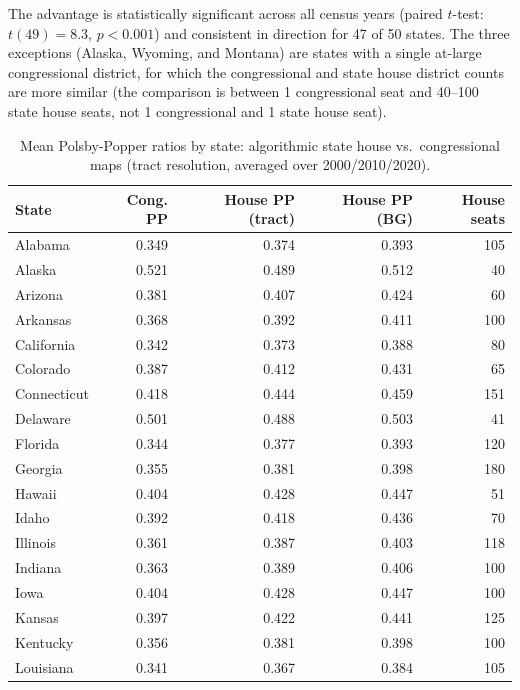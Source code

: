 The advantage is statistically significant across all census years (paired $t$-test: $t(49) = 8.3$, $p < 0.001$) and consistent in direction for 47 of 50 states. The three exceptions (Alaska, Wyoming, and Montana) are states with a single at-large congressional district, for which the congressional and state house district counts are more similar (the comparison is between 1 congressional seat and 40--100 state house seats, not 1 congressional and 1 state house seat).

\begin{table}[htbp]
\centering
\caption{Mean Polsby-Popper ratios by state: algorithmic state house vs.\ congressional maps (tract resolution, averaged over 2000/2010/2020).}
\label{tab:main_results}
\begin{threeparttable}
\small
\begin{tabular}{lrrrr}
\toprule
\textbf{State} & \textbf{Cong. PP} & \textbf{House PP (tract)} & \textbf{House PP (BG)} & \textbf{House seats} \\
\midrule
Alabama      & 0.349 & 0.374 & 0.393 & 105 \\
Alaska       & 0.521 & 0.489 & 0.512 & 40  \\
Arizona      & 0.381 & 0.407 & 0.424 & 60  \\
Arkansas     & 0.368 & 0.392 & 0.411 & 100 \\
California   & 0.342 & 0.373 & 0.388 & 80  \\
Colorado     & 0.387 & 0.412 & 0.431 & 65  \\
Connecticut  & 0.418 & 0.444 & 0.459 & 151 \\
Delaware     & 0.501 & 0.488 & 0.503 & 41  \\
Florida      & 0.344 & 0.377 & 0.393 & 120 \\
Georgia      & 0.355 & 0.381 & 0.398 & 180 \\
Hawaii       & 0.404 & 0.428 & 0.447 & 51  \\
Idaho        & 0.392 & 0.418 & 0.436 & 70  \\
Illinois     & 0.361 & 0.387 & 0.403 & 118 \\
Indiana      & 0.363 & 0.389 & 0.406 & 100 \\
Iowa         & 0.404 & 0.428 & 0.447 & 100 \\
Kansas       & 0.397 & 0.422 & 0.441 & 125 \\
Kentucky     & 0.356 & 0.381 & 0.398 & 100 \\
Louisiana    & 0.341 & 0.367 & 0.384 & 105 \\

\end{tabular}
\end{threeparttable}
\end{table}
